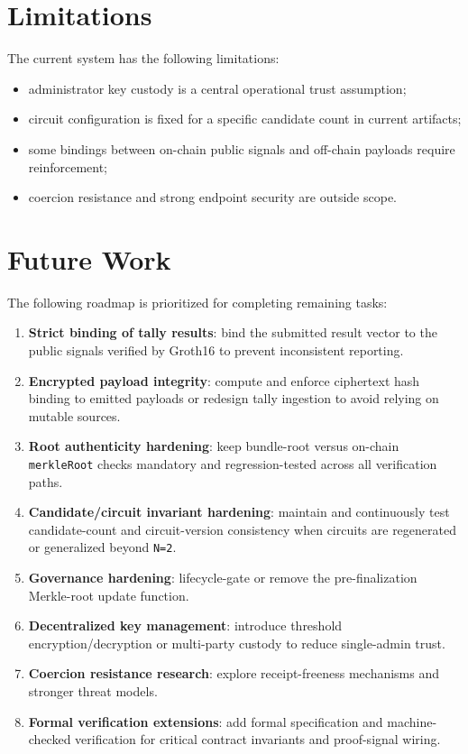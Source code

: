\section{Limitations}

The current system has the following limitations:
\begin{itemize}
    \item administrator key custody is a central operational trust assumption;
    \item circuit configuration is fixed for a specific candidate count in current artifacts;
    \item some bindings between on-chain public signals and off-chain payloads require reinforcement;
    \item coercion resistance and strong endpoint security are outside scope.
\end{itemize}

\section{Future Work}

The following roadmap is prioritized for completing remaining tasks:
\begin{enumerate}
    \item \textbf{Strict binding of tally results}: bind the submitted result vector to the public signals verified by Groth16 to prevent inconsistent reporting.
    \item \textbf{Encrypted payload integrity}: compute and enforce ciphertext hash binding to emitted payloads or redesign tally ingestion to avoid relying on mutable sources.
    \item \textbf{Root authenticity hardening}: keep bundle-root versus on-chain \texttt{merkleRoot} checks mandatory and regression-tested across all verification paths.
    \item \textbf{Candidate/circuit invariant hardening}: maintain and continuously test candidate-count and circuit-version consistency when circuits are regenerated or generalized beyond \texttt{N=2}.
    \item \textbf{Governance hardening}: lifecycle-gate or remove the pre-finalization Merkle-root update function.
    \item \textbf{Decentralized key management}: introduce threshold encryption/decryption or multi-party custody to reduce single-admin trust.
    \item \textbf{Coercion resistance research}: explore receipt-freeness mechanisms and stronger threat models.
    \item \textbf{Formal verification extensions}: add formal specification and machine-checked verification for critical contract invariants and proof-signal wiring.
\end{enumerate}

